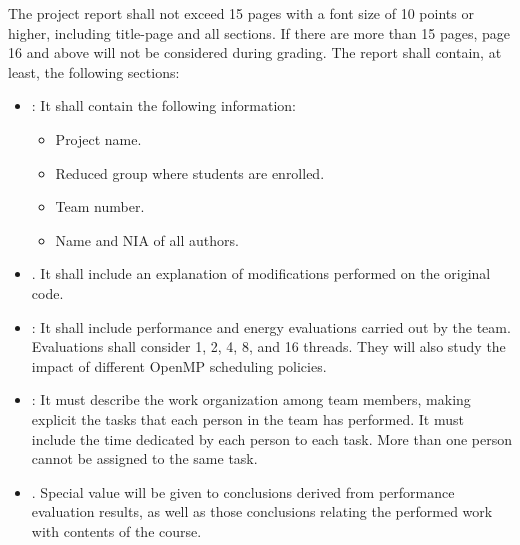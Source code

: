 The project report shall not exceed 15 pages with a font size of 10 points
or higher, including title-page and all sections. If there are more than
15 pages, page 16 and above will not be considered during grading.
The report shall contain, at least, the following sections:

\begin{itemize}

\item {}: It shall contain the following information:
  \begin{itemize}
    \item Project name.
    \item Reduced group where students are enrolled.
    \item Team number.
    \item Name and NIA of all authors.
  \end{itemize}

\item {}.
      It shall include an explanation of modifications performed on the
      original code.

\item {}: 
      It shall include performance and energy evaluations carried out by the team.
      Evaluations shall consider 1, 2, 4, 8, and 16 threads.
      They will also study the impact of different OpenMP scheduling policies.

\item {}:
      It must describe the work organization among team members, 
      making explicit the tasks that each person in the team has performed.
      It must include the time dedicated by each person to each task.
      More than one person cannot be assigned to the same task.

\item {}.
      Special value will be given to conclusions derived from performance evaluation
      results, as well as those conclusions relating the performed work with
      contents of the course.
\end{itemize}
